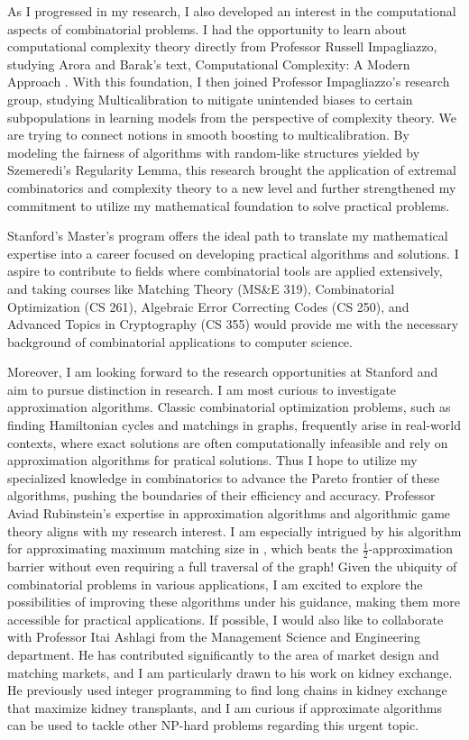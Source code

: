 \documentclass[12pt]{article}
\begin{document}
As I progressed in my research, I also developed an interest in the computational aspects of combinatorial problems. I had the opportunity to learn about computational complexity theory directly from Professor Russell Impagliazzo, studying Arora and Barak's text, Computational Complexity: A Modern Approach \cite{arora2009computational}. With this foundation, I then joined Professor Impagliazzo's research group, studying Multicalibration to mitigate unintended biases to certain subpopulations in learning models from the perspective of complexity theory. We are trying to connect notions in smooth boosting to multicalibration. By modeling the fairness of algorithms with random-like structures yielded by Szemeredi's Regularity Lemma, this research brought the application of extremal combinatorics and complexity theory to a new level and further strengthened my commitment to utilize my mathematical foundation to solve practical problems.

Stanford's Master's program offers the ideal path to translate my mathematical expertise into a career focused on developing practical algorithms and solutions. I aspire to contribute to fields where combinatorial tools are applied extensively, and taking courses like Matching Theory (MS\&E 319), Combinatorial Optimization (CS 261), Algebraic Error Correcting Codes (CS 250), and Advanced Topics in Cryptography (CS 355) would provide me with the necessary background of combinatorial applications to computer science.

Moreover, I am looking forward to the research opportunities at Stanford and aim to pursue distinction in research. I am most curious to investigate approximation algorithms. Classic combinatorial optimization problems, such as finding Hamiltonian cycles and matchings in graphs, frequently arise in real-world contexts, where exact solutions are often computationally infeasible and rely on approximation algorithms for pratical solutions. Thus I hope to utilize my specialized knowledge in combinatorics to advance the Pareto frontier of these algorithms, pushing the boundaries of their efficiency and accuracy. Professor Aviad Rubinstein's expertise in approximation algorithms and algorithmic game theory aligns with my research interest. I am especially intrigued by his algorithm for approximating maximum matching size in \cite{doi:10.1137/1.9781611977554.ch151}, which beats the $\frac{1}{2}$-approximation barrier without even requiring a full traversal of the graph! Given the ubiquity of
combinatorial problems in various applications, I am excited to explore the possibilities of improving these algorithms under his guidance, making them more accessible for practical applications. If possible, I would also like to collaborate with Professor Itai Ashlagi from the Management Science and Engineering department. He has contributed significantly to the area of market design and matching markets, and I am particularly drawn to his work on kidney exchange. He previously used integer programming to find long chains in kidney exchange that maximize kidney transplants\cite{doi:10.1073/pnas.1421853112}, and I am curious if approximate algorithms can be used to tackle other NP-hard problems regarding this urgent topic.
\end{document}
